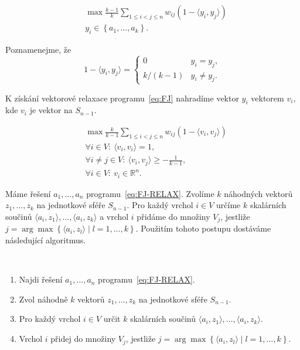 \begin{equation}\tag{FJ}
    \begin{split}
        &\max \frac{k-1}{k} \sum_{1 \leq i < j \leq n} w_{ij} (1 - \langle y_i, y_j \rangle) \\
        &y_i \in \left\{ a_1, \dots, a_k \right\}.
    \end{split}
    \label{eq:FJ}
\end{equation}

\noindent Poznamenejme, že
$$
    1 - \langle y_i, y_j \rangle = 
    \begin{cases}
        0           & y_i = y_j, \\
        k / (k - 1) & y_i \neq y_j.
    \end{cases}
$$

\noindent K získání vektorové relaxace programu~\ref{eq:FJ} nahradíme vektor $y_i$ vektorem $v_i$, kde $v_i$ je vektor na $S_{n-1}$.

\begin{equation}\tag{FJ-RELAX}
    \begin{split}
        &\max \frac{k}{k-1} \sum_{1 \leq i < j \leq n} w_{ij} (1 - \langle v_i, v_j \rangle) \\
        &\forall i \in V:\ \langle v_i, v_i \rangle = 1, \\
        &\forall i \neq j \in V:\ \langle v_i, v_j \rangle \geq -\frac{1}{k-1}, \\
        &\forall i \in V:\ v_i \in \mathbb{R}^n.
    \end{split}
    \label{eq:FJ-RELAX}
\end{equation}


Máme řešení $a_1, \dots, a_n$ programu~\ref{eq:FJ-RELAX}. Zvolíme $k$ náhodných vektorů $z_1, \dots, z_k$ na jednotkové sféře $S_{n-1}$. Pro každý vrchol $i \in V$ určíme $k$ skalárních součinů $\langle a_i, z_1 \rangle, \dots, \langle a_i, z_k \rangle$ a vrchol $i$ přidáme do množiny $V_j$, jestliže $j = \arg \max \left\{ \langle a_i, z_l \rangle \mid l = 1, \dots, k \right\}$. Použitím tohoto postupu dostáváme následující algoritmus.

\begin{alg}$ $
    \begin{enumerate}
        \item Najdi řešení $a_1, \dots, a_n$ programu~\ref{eq:FJ-RELAX}.
        \item Zvol náhodně $k$ vektorů $z_1, \dots, z_k$ na jednotkové sféře $S_{n-1}$.
        \item Pro každý vrchol $i \in V$ určit $k$ skalárních součinů $\langle a_i, z_1 \rangle, \dots, \langle a_i, z_k \rangle$.
        \item Vrchol $i$ přidej do množiny $V_j$, jestliže $j = \arg \max \left\{ \langle a_i, z_l \rangle \mid l = 1, \dots, k \right\}$.
    \end{enumerate}
    \label{alg:fj-max-k-cut}
\end{alg}


